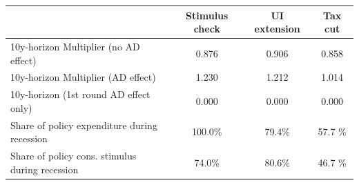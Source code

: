 \begin{tabular}{@{}lccc@{}} 
\toprule 
& Stimulus check    & UI extension    & Tax cut     \\  \midrule 
10y-horizon Multiplier (no AD effect) &0.876  & 0.906  & 0.858     \\ 
10y-horizon Multiplier (AD effect) &1.230  & 1.212  & 1.014     \\ 
10y-horizon (1st round AD effect only) &0.000  & 0.000  & 0.000     \\ 
Share of policy expenditure during recession &100.0\%  & 79.4\%  & 57.7 \%    \\ 
Share of policy cons. stimulus during recession &74.0\%  & 80.6\%  & 46.7 \%    \\ \bottomrule 
\end{tabular}  
